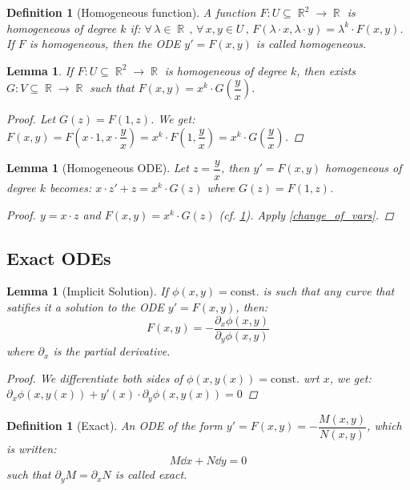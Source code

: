 \documentclass[12pt]{article}
\newcommand{\Forall}[1]{\forall\,{#1}\,,\,}
\DeclareMathOperator{\R}{\mathbb{R}}
\newcommand*{\pdx}{\partial_x}
\newcommand*{\pdy}{\partial_y}
\newtheorem{definition}[theorem]{Definition}
\newtheorem{lemma}[theorem]{Lemma}
\begin{document}
\begin{definition}[Homogeneous function]
  A function $F:U\subseteq \R^2\to\R$ is homogeneous of degree $k$ if: $\Forall{\lambda\in\R}\Forall{x,y\in U}F(\lambda\cdot x,\lambda \cdot y)=\lambda^k\cdot F(x,y)$.
  If $F$ is homogeneous, then the ODE $y'=F(x,y)$ is called homogeneous.
\end{definition} 

\begin{lemma}
  \label{hom_func}
  If  $F:U\subseteq \R^2\to\R$ is homogeneous of degree $k$, then exists $G: V\subseteq\R\to\R$ such that $F(x,y)=x^k\cdot G\left(\dfrac{y}{x}\right)$.
  \begin{proof}
    Let $G(z)=F(1,z)$. We get: $F(x,y)=F\left(x\cdot 1,x\cdot\dfrac{y}{x}\right)=x^k\cdot F\left(1,\dfrac{y}{x}\right)=x^k\cdot G\left(\dfrac{y}{x}\right)$.
  \end{proof}
\end{lemma}

\begin{lemma}[Homogeneous ODE]
  Let $z=\dfrac{y}{x}$, then $y'=F(x,y)$ homogeneous of degree $k$ becomes: $x\cdot z'+z=x^k\cdot G(z)$ where $G(z)=F(1,z)$.
  \begin{proof}
    $y=x\cdot z$ and $F(x,y)=x^k\cdot G(z)$ (cf. \ref{hom_func}). Apply \ref{change_of_vars}.
  \end{proof}
\end{lemma}

\pagebreak

\subsection{Exact ODEs}

\begin{lemma}[Implicit Solution]
  \label{implicit}
  If $\phi(x,y)=\text{const.}$ is such that any curve that satifies it a solution to the ODE $y'=F(x,y)$, then: $$F(x,y)=-\frac{\pdx\phi(x,y)}{\pdy\phi(x,y)}$$ where $\pdx$ is the partial derivative.
  \begin{proof}
    We differentiate both sides of $\phi(x,y(x))=\text{const.}$ wrt $x$, we get: $ \pdx\phi(x,y(x))+y'(x)\cdot\pdy\phi(x,y(x))=0$
  \end{proof}
\end{lemma}

\begin{definition}[Exact]
  An ODE of the form $y'=F(x,y)=-\dfrac{M(x,y)}{N(x,y)}$, which is written: $$M\dd{x}+N\dd{y}=0$$ such that $\pdy M=\pdx N$ is called exact.
\end{definition}
\end{document}
